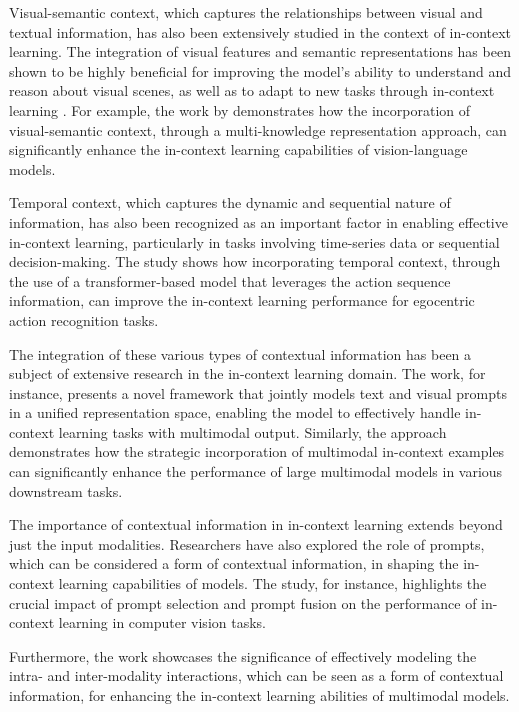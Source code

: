 \documentclass[11pt]{article}
\begin{document}
Visual-semantic context, which captures the relationships between visual and textual information, has also been extensively studied in the context of in-context learning. The integration of visual features and semantic representations has been shown to be highly beneficial for improving the model's ability to understand and reason about visual scenes, as well as to adapt to new tasks through in-context learning \cite{ref37}. For example, the work by \cite{ref37} demonstrates how the incorporation of visual-semantic context, through a multi-knowledge representation approach, can significantly enhance the in-context learning capabilities of vision-language models.

Temporal context, which captures the dynamic and sequential nature of information, has also been recognized as an important factor in enabling effective in-context learning, particularly in tasks involving time-series data or sequential decision-making. The \cite{ref38} study shows how incorporating temporal context, through the use of a transformer-based model that leverages the action sequence information, can improve the in-context learning performance for egocentric action recognition tasks.

The integration of these various types of contextual information has been a subject of extensive research in the in-context learning domain. The \cite{ref11} work, for instance, presents a novel framework that jointly models text and visual prompts in a unified representation space, enabling the model to effectively handle in-context learning tasks with multimodal output. Similarly, the \cite{ref39} approach demonstrates how the strategic incorporation of multimodal in-context examples can significantly enhance the performance of large multimodal models in various downstream tasks.

The importance of contextual information in in-context learning extends beyond just the input modalities. Researchers have also explored the role of prompts, which can be considered a form of contextual information, in shaping the in-context learning capabilities of models. The \cite{ref24} study, for instance, highlights the crucial impact of prompt selection and prompt fusion on the performance of in-context learning in computer vision tasks.

Furthermore, the \cite{ref40} work showcases the significance of effectively modeling the intra- and inter-modality interactions, which can be seen as a form of contextual information, for enhancing the in-context learning abilities of multimodal models.
\end{document}
